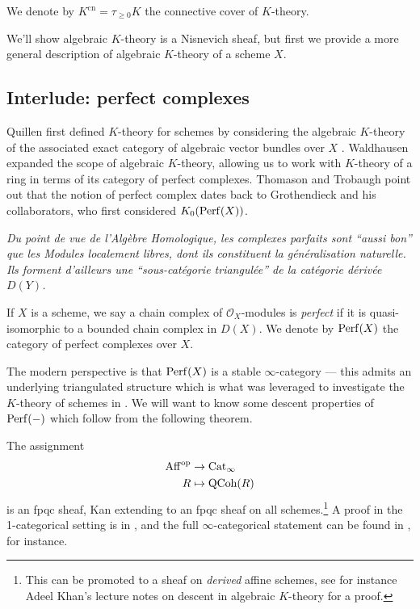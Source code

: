 \documentclass[11pt,openany]{book}
\providecommand{\cn}{\mathrm{cn}}
\newcommand{\quoteblock}[2]{\epigraph{\itshape#1}{#2}}
\begin{document}
\begin{notation} We denote by $K^\cn = \tau_{\ge 0} K$ the connective cover of $K$-theory.
\end{notation}

We'll show algebraic $K$-theory is a Nisnevich sheaf, but first we provide a more general description of algebraic $K$-theory of a scheme $X$.

\subsection{Interlude: perfect complexes}

Quillen first defined $K$-theory for schemes by considering the algebraic $K$-theory of the associated exact category of algebraic vector bundles over $X$ \cite[\S7]{Quillen-K1}. Waldhausen expanded the scope of algebraic $K$-theory, allowing us to work with $K$-theory of a ring in terms of its category of perfect complexes. Thomason and Trobaugh \cite{TT} point out that the notion of perfect complex dates back to Grothendieck and his collaborators, who first considered $K_0(\mathrm{Perf}(X))$.

\quoteblock{Du point de vue de l'Alg\`ebre Homologique,
les complexes parfaits sont ``aussi bon'' que les Modules localement libres, dont ils constituent la g\'en\'eralisation naturelle. Ils forment d'ailleurs une ``sous-cat\'egorie triangul\'ee'' de la cat\'egorie d\'eriv\'ee $D(Y)$.}{\cite[p.~6]{SGA6}}


\begin{definition} \cite[p.~11]{SGA6} If $X$ is a scheme, we say a chain complex of $\mathcal{O}_X$-modules is \textit{perfect} if it is quasi-isomorphic to a bounded chain complex in $D(X)$. We denote by $\mathrm{Perf}(X)$ the category of perfect complexes over $X$.
\end{definition}

The modern perspective is that $\mathrm{Perf}(X)$ is a stable $\infty$-category --- this admits an underlying triangulated structure which is what was leveraged to investigate the $K$-theory of schemes in \cite{TT}. We will want to know some descent properties of $\mathrm{Perf}(-)$ which follow from the following theorem.

\begin{theorem}\label{thm:qcoh-fpqc-descent} 
The assignment
\begin{align*}
    \mathrm{Aff}^{\mathrm{op}} &\to \mathrm{Cat}_\infty \\
    R &\mapsto \mathrm{QCoh}(R)
\end{align*}
is an fpqc sheaf, Kan extending to an fpqc sheaf on all schemes.\footnote{This can be promoted to a sheaf on \textit{derived} affine schemes, see for instance Adeel Khan's lecture notes on descent in algebraic $K$-theory for a proof.} A proof in the 1-categorical setting is in \cite[04Q7]{Stacks}, and the full $\infty$-categorical statement can be found in \cite[D.6.3.1]{SAG}, for instance.
\end{theorem}
\end{document}
